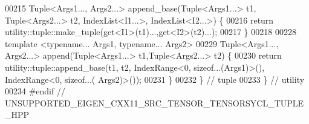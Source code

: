 \begin{DoxyCode}
00215 Tuple<Args1..., Args2...> append\_base(Tuple<Args1...> t1, Tuple<Args2...> t2, IndexList<I1...>, 
      IndexList<I2...>) \{
00216   \textcolor{keywordflow}{return} utility::tuple::make\_tuple(get<I1>(t1)...,get<I2>(t2)...);
00217 \}
00218 
00228 \textcolor{keyword}{template} <\textcolor{keyword}{typename}... Args1, \textcolor{keyword}{typename}... Args2>
00229 Tuple<Args1..., Args2...> append(Tuple<Args1...> t1,Tuple<Args2...> t2) \{
00230   \textcolor{keywordflow}{return} utility::tuple::append\_base(t1, t2, IndexRange<0, \textcolor{keyword}{sizeof}...(Args1)>(), IndexRange<0, \textcolor{keyword}{sizeof}...(
      Args2)>());
00231 \}
00232 \}  \textcolor{comment}{// tuple}
00233 \}  \textcolor{comment}{// utility}
00234 \textcolor{preprocessor}{#endif  // UNSUPPORTED\_EIGEN\_CXX11\_SRC\_TENSOR\_TENSORSYCL\_TUPLE\_HPP}
\end{DoxyCode}
